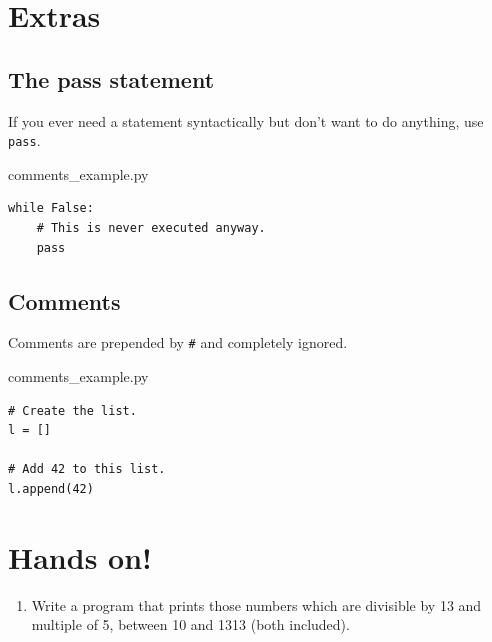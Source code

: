 \documentclass[aspectratio=1610,t]{beamer}
\begin{document}
\section{Extras}

\subsection{The pass statement}
\begin{pframe}
 If you ever need a statement syntactically but don't want to do anything, use \texttt{pass}.
 \begin{pythonfile}{comments\_example.py}
  \begin{verbatim}
while False:
    # This is never executed anyway.
    pass
  \end{verbatim}
 \end{pythonfile}
\end{pframe}

\subsection{Comments}
\begin{pframe}
 Comments are prepended by \texttt{\#} and completely ignored.
 \begin{pythonfile}{comments\_example.py}
  \begin{verbatim}
# Create the list.
l = []

# Add 42 to this list.
l.append(42)
  \end{verbatim}
 \end{pythonfile}
\end{pframe}

\section{Hands on!}
\begin{pframe}
 \vspace{-0.5cm}
 \begin{enumerate}
  \item Write a program that prints those numbers which are divisible by
  13 and multiple of 5, between 10 and 1313 (both included).
 \end{enumerate}
\end{pframe}
\end{document}

